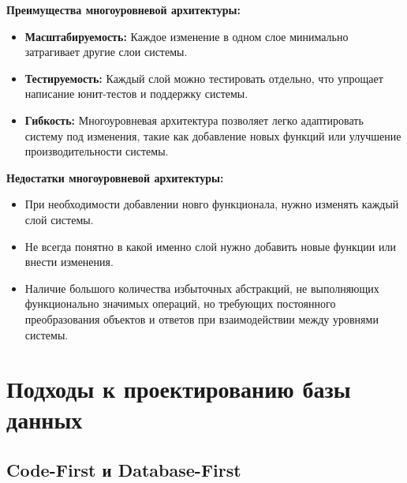 \documentclass[a4paper,12pt]{report}
\begin{document}
\textbf{Преимущества многоуровневой архитектуры:}
\begin{itemize}
    \item
        \textbf{Масштабируемость:} Каждое изменение в одном слое минимально затрагивает другие слои системы.
    \item
        \textbf{Тестируемость:} Каждый слой можно тестировать отдельно, что упрощает написание юнит-тестов и поддержку системы.
    \item
        \textbf{Гибкость:} Многоуровневая архитектура позволяет легко адаптировать систему под изменения, такие как добавление новых функций или улучшение производительности системы.
\end{itemize}

\textbf{Недостатки многоуровневой архитектуры:}
\begin{itemize}
    \item
        При необходимости добавлении новго функционала, нужно изменять каждый слой системы.
    \item
        Не всегда понятно в какой именно слой нужно добавить новые функции или внести изменения.
    \item
        Наличие большого количества избыточных абстракций, не выполняющих функционально значимых операций, 
        но требующих постоянного преобразования объектов и ответов при взаимодействии между уровнями системы.\cite{design_patterns_architecture}
\end{itemize}
 

\section{Подходы к проектированию базы данных}

\subsection{Code-First и Database-First}
\end{document}

